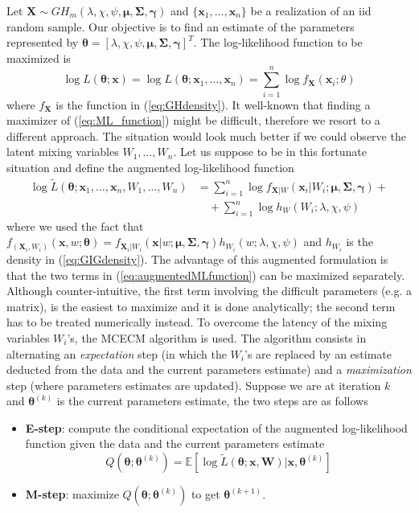 Let $\bm{X} \sim GH_m(\lambda,\chi,\psi,\bm{\mu},\bm{\Sigma},\bm{\gamma})$ and $\{\bm{x}_1,\ldots,\bm{x}_n\}$ be a realization of an iid random sample. Our objective is to find an estimate of the parameters represented by $\bm{\theta}=[\lambda,\chi,\psi,\bm{\mu},\bm{\Sigma},\bm{\gamma}]^T$. The log-likelihood function to be maximized is
\begin{equation}\label{eq:ML_function}
\log L(\bm{\theta};\bm{x}) = \log L(\bm{\theta};\bm{x}_1,\ldots,\bm{x}_n) = \sum_{i=1}^{n}\log f_{\bm{X}}(\bm{x}_i;\theta)
\end{equation}
where $f_{\bm{X}}$ is the function in (\ref{eq:GHdensity}). It well-known that finding a maximizer of (\ref{eq:ML_function}) might be difficult, therefore we resort to a different approach. The situation would look much better if we could observe the latent mixing variables $W_1,\ldots,W_n$. Let us suppose to be in this fortunate situation and define the augmented log-likelihood function
\begin{align}\label{eq:augmentedMLfunction}
\log \widetilde{L}(\bm{\theta};\bm{x}_1,\ldots,\bm{x}_n,W_1,\ldots,W_n)& = \sum_{i=1}^{n}\log f_{\bm{X}\lvert W}(\bm{x}_i\lvert W_i;\bm{\mu},\bm{\Sigma},\bm{\gamma}) + \\\nonumber
& \quad + \sum_{i=1}^{n}\log h_{W}(W_i;\lambda,\chi,\psi)
\end{align}
where we used the fact that $f_{(\bm{X}_i,W_i)}(\bm{x},w;\bm{\theta})= f_{\bm{X}_i\lvert W_i}(\bm{x}\lvert w;\bm{\mu},\bm{\Sigma},\bm{\gamma})h_{W_i} (w;\lambda,\chi,\psi) $ and $h_{W_i}$ is the density in (\ref{eq:GIGdensity}). The advantage of this augmented formulation is that the two terms in (\ref{eq:augmentedMLfunction}) can be maximized separately. Although counter-intuitive, the first term involving the difficult parameters (e.g. a matrix), is the easiest to maximize and it is done analytically; the second term has to be treated numerically instead. To overcome the latency of the mixing variables $W_i$'s, the \gls{MCECM} algorithm is used. The algorithm consists in alternating an \textit{expectation} step (in which the $W_i$'s are replaced by an estimate deducted from the data and the current parameters estimate) and a \textit{maximization} step (where parameters estimates are updated). Suppose we are at iteration $k$ and $\bm{\theta}^{(k)}$ is the current parameters estimate, the two steps are as follows
\begin{itemize}
	\item \textbf{E-step}: compute the conditional expectation of the augmented log-likelihood function given the data and the current parameters estimate 
	\begin{equation}\label{eq:Q}
	Q(\bm{\theta};\bm{\theta}^{(k)}) = \mathbb{E}[\log \widetilde{L}(\bm{\theta};\bm{x},\bm{W})\lvert \bm{x},\bm{\theta}^{(k)}]
	\end{equation}
	\item \textbf{M-step}: maximize $Q(\bm{\theta};\bm{\theta}^{(k)})$ to get $\bm{\theta}^{(k+1)}$.
\end{itemize}

